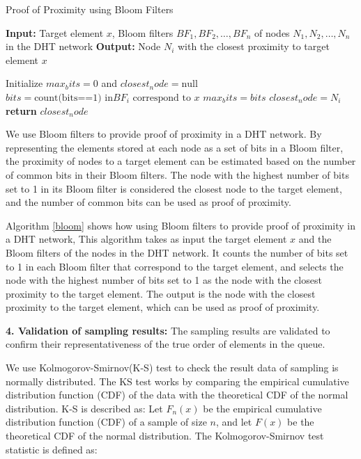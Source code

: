 \documentclass[twocolumn]{article}
\begin{document}
\begin{algorithm}[htbp]
  \caption{Proof of Proximity using Bloom Filters\cite{bloom_filter}}
  \label{bloom}
\begin{algorithmic}[1]
\State \textbf{Input:} Target element $x$, Bloom filters $BF_1, BF_2, \dots, BF_n$ of nodes $N_1, N_2, \dots, N_n$ in the DHT network
\State \textbf{Output:} Node $N_i$ with the closest proximity to target element $x$

\State Initialize $max_bits = 0$ and $closest_node = \text{null}$
\State $bits = \text{count(bits==1) in} BF_i \text{ correspond to } x$
\State $max_bits = bits$
\State $closest_node = N_i$
\EndIf
\EndFor
\State \textbf{return} $closest_node$
\end{algorithmic}
\end{algorithm}

We use Bloom filters to provide proof of proximity in a DHT network. By representing the elements stored at each node as a set of bits in a Bloom filter, the proximity of nodes to a target element can be estimated based on the number of common bits in their Bloom filters. The node with the highest number of bits set to 1 in its Bloom filter is considered the closest node to the target element, and the number of common bits can be used as proof of proximity.

Algorithm \ref{bloom} shows how using Bloom filters to provide proof of proximity in a DHT network, This algorithm takes as input the target element $x$ and the Bloom filters of the nodes in the DHT network. It counts the number of bits set to 1 in each Bloom filter that correspond to the target element, and selects the node with the highest number of bits set to 1 as the node with the closest proximity to the target element. The output is the node with the closest proximity to the target element, which can be used as proof of proximity.

\textbf{4. Validation of sampling results:} The sampling results are validated to confirm their representativeness of the true order of elements in the queue.

We use Kolmogorov-Smirnov(K-S) test to check the result data of sampling is normally distributed. The KS test works by comparing the empirical cumulative distribution function (CDF) of the data with the theoretical CDF of the normal distribution. K-S is described as:
Let $F_{n}(x)$ be the empirical cumulative distribution function (CDF) of a sample of size $n$, and let $F(x)$ be the theoretical CDF of the normal distribution. The Kolmogorov-Smirnov test statistic is defined as:
\end{document}
